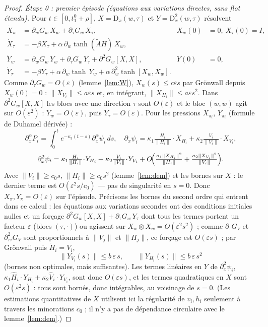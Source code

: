 \documentclass[11pt,a4paper]{article}
\theoremstyle{remark}
\theoremstyle{definition}
\newcommand{\norm}[1]{\lVert #1\rVert}
\newcommand{\eps}{\varepsilon}
\newcommand{\D}{\mathrm D}
\begin{document}
\begin{proof}
\emph{Étape 0 : premier épisode (équations aux variations directes, sans flot étendu).} Pour $t\in[0,t_1^0+\rho]$, $X=\D_x(w,\tau)$ et $Y=\D_x^2(w,\tau)$ résolvent
\begin{align*}
\dot X_w&=\partial_wG_w\,X_w+\partial_\tau G_w\,X_\tau, & X_w(0)&=0,\ X_\tau(0)=I,\\
\dot X_\tau&=-\beta X_\tau+\alpha\,\partial_w\tanh(\tilde AH)\,X_w ,\\
\dot Y_w&=\partial_wG_w\,Y_w+\partial_\tau G_w\,Y_\tau+\partial^2G_w[X,X], & Y(0)&=0,\\
\dot Y_\tau&=-\beta Y_\tau+\alpha\,\partial_w\tanh\,Y_w+\alpha\,\partial_w^2\tanh[X_w,X_w] .
\end{align*}
Comme $\partial_\tau G_w=O(\eps)$ (lemme~\ref{lem:W}), $X_w(s)\le c\eps s$ par Grönwall depuis $X_w(0)=0$ : $\norm{X_{V_i}}\le a\eps s$ et, en intégrant, $\norm{X_{H_i}}\le a\eps s^2$. Dans $\partial^2G_w[X,X]$ les blocs avec une direction $\tau$ sont $O(\eps)$ et le bloc $(w,w)$ agit sur $O(\eps^2)$ : $Y_w=O(\eps)$, puis $Y_\tau=O(\eps)$. Pour les pressions $X_{\pi_i}$, $Y_{\pi_i}$ (formule de Duhamel dérivée) :
\[
\partial_x^\alpha P_i=\int_0^te^{-\kappa_3(t-s)}\partial_x^\alpha\psi_i\,ds,\quad \partial_x\psi_i=\kappa_1\tfrac{H_i}{\norm{H_i}}\!\cdot\! X_{H_i}+\kappa_2\tfrac{V_i}{\norm{V_i}}\!\cdot\! X_{V_i},
\]
\[
\partial_x^2\psi_i=\kappa_1\tfrac{H_i}{\norm{H_i}}\!\cdot\! Y_{H_i}+\kappa_2\tfrac{V_i}{\norm{V_i}}\!\cdot\! Y_{V_i}+O\!\Bigl(\tfrac{\kappa_1\norm{X_{H_i}}^2}{\norm{H_i}}+\tfrac{\kappa_2\norm{X_{V_i}}^2}{\norm{V_i}}\Bigr).
\]
Avec $\norm{V_i}\ge c_0s$, $\norm{H_i}\ge c_0s^2$ (lemme~\ref{lem:dem}) et les bornes sur $X$ : le dernier terme est $O(\eps^2s/c_0)$ --- pas de singularité en $s=0$. Donc $X_\pi,Y_\pi=O(\eps)$ sur l'épisode. Précisons les bornes du second ordre qui entrent dans ce calcul : les équations aux variations secondes ont des conditions initiales nulles et un forçage $\partial^2G_w[X,X]+\partial_\tau G_w\,Y_\tau$ dont tous les termes portent un facteur $\eps$ (blocs $(\tau,\cdot)$) ou agissent sur $X_w\otimes X_w=O(\eps^2s^2)$ ; comme $\partial_\tau G_V$ et $\partial^2_{\tau\tau}G_V$ sont proportionnels à $\norm{V_j}$ et $\norm{H_j}$, ce forçage est $O(\eps s)$ ; par Grönwall puis $\dot H_i=V_i$,
\[
\boxed{\ \norm{Y_{V_i}(s)}\le b\,\eps\,s,\qquad \norm{Y_{H_i}(s)}\le b\,\eps\,s^2\ }
\]
(bornes non optimales, mais suffisantes). Les termes linéaires en $Y$ de $\partial_x^2\psi_i$, $\kappa_1\hat H_i\!\cdot\!Y_{H_i}+\kappa_2\hat V_i\!\cdot\!Y_{V_i}$, sont donc $O(\eps s)$, et les termes quadratiques en $X$ sont $O(\eps^2s)$ : tous sont bornés, donc intégrables, au voisinage de $s=0$. (Les estimations quantitatives de $X$ utilisent ici la régularité de $v_i,h_i$ seulement à travers les minorations $c_0$ ; il n'y a pas de dépendance circulaire avec le lemme~\ref{lem:dem}.)


\end{proof}
\end{document}
